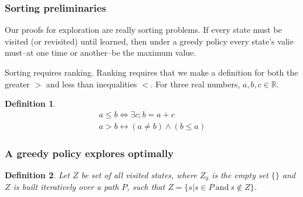 \documentclass[9pt,twocolumn,twoside]{pnas-new}
\newtheorem{definition}{Definition}
\begin{document}
\subsubsection*{Sorting preliminaries}
Our proofs for exploration are really sorting problems. If every state must be visited (or revisited) until learned, then under a greedy policy every state's valie must--at one time or another--be the maximum value. 

Sorting requires ranking. Ranking requires that we make a definition for both the greater $>$ and less than inequalities $<$. For three real numbers, ${a,b,c} \in \mathbb{R}$.

\begin{definition} \label{def:ineq}
    \begin{align}
        a \leq b \Leftrightarrow \exists c; b = a + c \\
        a > b \leftrightarrow (a \neq b) \wedge (b \leq a) 
    \end{align}
\end{definition}

\subsubsection*{A greedy policy explores optimally}


\begin{definition}
    Let $Z$ be set of all visited states, where $Z_0$ is the empty set $\{\}$ and $Z$ is built iteratively over a path $P$, such that $Z = \{s | s \in P\ \text{and}\ s \not\in Z\}$.    
\end{definition}
\end{document}
